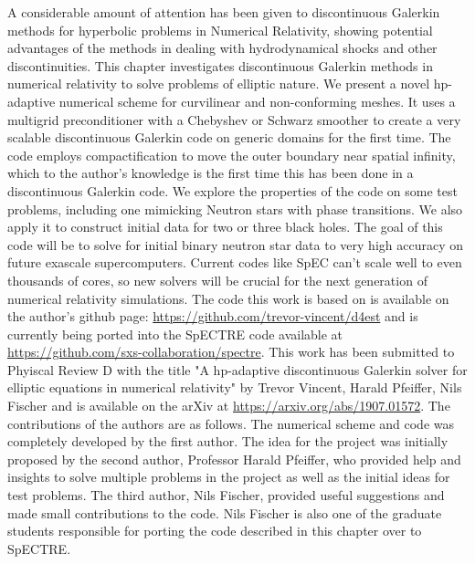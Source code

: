 A considerable amount of attention has been given to discontinuous
Galerkin methods for hyperbolic problems in Numerical Relativity,
showing potential advantages of the methods in dealing with
hydrodynamical shocks and other discontinuities.
This chapter investigates discontinuous Galerkin
methods in numerical relativity to solve problems of elliptic
nature.  We present a novel hp-adaptive numerical
scheme for curvilinear and non-conforming meshes.  It uses a multigrid
preconditioner with a Chebyshev or Schwarz smoother to create a very scalable discontinuous Galerkin code
on generic domains for the first time.  The code employs compactification
  to move the outer boundary near spatial infinity, which to the author's knowledge is the first time this has been done in a discontinuous Galerkin code. 
We explore the properties of the code on some test
problems, including one mimicking Neutron stars with phase transitions.
  We also apply it to construct initial data for two or three black holes. The goal of this code will be to solve for initial binary neutron star data to very high accuracy on future exascale supercomputers. Current codes like SpEC can't scale well to even thousands of cores, so new solvers will be crucial for the next generation of numerical relativity simulations. The code this work is based on is available on the author's github page: \url{https://github.com/trevor-vincent/d4est} and is currently being ported into the SpECTRE code available at \url{https://github.com/sxs-collaboration/spectre}. This work has been submitted to Phyiscal Review D with the title "A hp-adaptive discontinuous Galerkin solver for elliptic equations in numerical relativity" by Trevor Vincent, Harald Pfeiffer, Nils Fischer and is available on the arXiv at \url{https://arxiv.org/abs/1907.01572}. The contributions of the authors are as follows. The numerical scheme and code was completely developed by the first author. The idea for the project was initially proposed by the second author, Professor Harald Pfeiffer, who provided help and insights to solve multiple problems in the project as well as the initial ideas for test problems. The third author, Nils Fischer, provided useful suggestions and made small contributions to the code. Nils Fischer is also one of the graduate students responsible for porting the code described in this chapter over to SpECTRE. 

